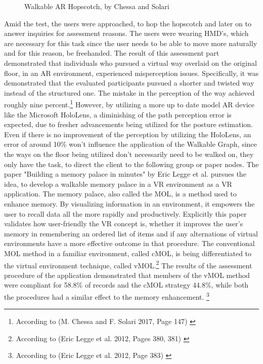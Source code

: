 \documentclass[12pt,a4paper,oneside,american,parskip=half]{article}
\begin{document}
\begin{justify}
\begin{normalsize}
\begin{figure}[h!]
\caption{Walkable AR Hopscotch, by Chessa and Solari \cite{arhopscotch}}
\end{figure}
\newline
Amid the test, the users were approached, to hop the hopscotch and later on to answer inquiries for assessment reasons. The users were wearing HMD's, which are necessary for this task since the user needs to be able to move more naturally and for this reason, be freehanded. The result of this assessment part demonstrated that individuals who pursued a virtual way overlaid on the original floor, in an AR environment, experienced misperception issues. Specifically, it was demonstrated that the evaluated participants pursued a shorter and twisted way instead of the structured one. The mistake in the perception of the way achieved roughly nine percent.\footnote{According to (M. Chessa and F. Solari 2017, Page 147) \cite{arhopscotch}}
\newline
However, by utilizing a more up to date model AR device like the Microsoft HoloLens, a diminishing of the path perception error is expected, due to fresher advancements being utilized for the posture estimation. Even if there is no improvement of the perception by utilizing the HoloLens, an error of around 10\% won't influence the application of the Walkable Graph, since the ways on the floor being utilized don't necessarily need to be walked on, they only have the task, to direct the client to the following group or paper nodes.
\newline
\newline
The paper "Building a memory palace in minutes" by Eric Legge et al. pursues the idea, to develop a walkable memory palace in a VR environment as a VR application. The memory palace, also called the \ac{MOL}, is a method used to enhance memory. By visualizing information in an environment, it empowers the user to recall data all the more rapidly and productively.
Explicitly this paper validates how user-friendly the VR concept is, whether it improves the user's memory in remembering an ordered list of items and if any alternations of virtual environments have a more effective outcome in that procedure.
The conventional MOL method in a familiar environment, called cMOL, is being differentiated to the virtual environment technique, called vMOL.\footnote{According to (Eric Legge et al. 2012, Pages 380, 381) \cite{mempalace}}
\newline
The results of the assessment procedure of the application demonstrated that members of the vMOL method were compliant for 58.8\% of records and the cMOL strategy 44.8\%, while both the procedures had a similar effect to the memory enhancement. \footnote{According to (Eric Legge et al. 2012, Page 383) \cite{mempalace}} 

\end{normalsize}
\end{justify}
\end{document}
